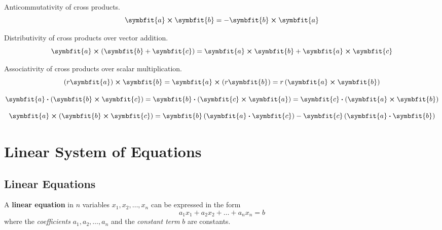 \documentclass{article}
\begin{document}
	\begin{theorem}
		Anticommutativity of cross products.
		\begin{equation*}
			\symbfit{a}\cross \symbfit{b} = -\symbfit{b}\cross \symbfit{a}
		\end{equation*}
	\end{theorem}
	\begin{theorem}
		Distributivity of cross products over vector addition.
		\begin{equation*}
			\symbfit{a}\cross\left( \symbfit{b}+\symbfit{c} \right) = \symbfit{a}\cross\symbfit{b} + \symbfit{a}\cross\symbfit{c}
		\end{equation*}
	\end{theorem}
	\begin{theorem}
		Associativity of cross products over scalar multiplication.
		\begin{equation*}
			\left( r \symbfit{a}\right)\cross\symbfit{b} = \symbfit{a}\cross\left( r \symbfit{b} \right) = r\left(\symbfit{a}\cross\symbfit{b}\right)
		\end{equation*}
	\end{theorem}
	\begin{theorem}
		\begin{equation*}
			\symbfit{a} \vdot \left(\symbfit{b}\cross\symbfit{c}\right) = \symbfit{b} \vdot \left(\symbfit{c}\cross\symbfit{a}\right) = \symbfit{c} \vdot \left(\symbfit{a}\cross\symbfit{b}\right)
		\end{equation*}
	\end{theorem}
	\begin{theorem}
		\begin{equation*}
			\symbfit{a} \cross \left(\symbfit{b}\cross\symbfit{c}\right) = \symbfit{b} \left(\symbfit{a}\vdot\symbfit{c}\right) - \symbfit{c}\left(\symbfit{a}\vdot\symbfit{b}\right)
		\end{equation*}
	\end{theorem}
	\newpage
\section{Linear System of Equations}
	\subsection{Linear Equations}
	\begin{definition}
		A \textbf{linear equation} in $n$ variables $x_1, x_2, \dots, x_n$ can be expressed in the form
		\begin{equation*}
			a_{1}x_1 + a_{2}x_2 + \dots + a_{n}x_n = b
		\end{equation*}
		where the \textit{coefficients} $a_1, a_2, \dots, a_n$ and the \textit{constant term} $b$ are constants.
	\end{definition}
\end{document}
